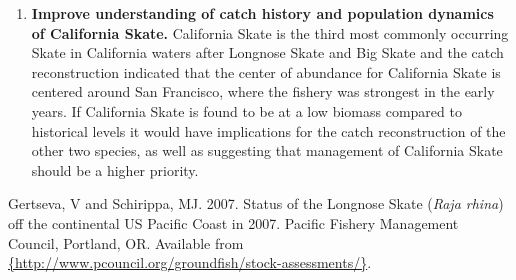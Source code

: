 \documentclass[12pt,]{article}
\begin{document}
\begin{enumerate}
\item \textbf{Improve understanding of catch history and population dynamics of California Skate.} California Skate is the third most commonly occurring Skate in California waters after Longnose Skate and Big Skate and the catch reconstruction indicated that the center of abundance for California Skate is centered around San Francisco, where the fishery was strongest in the early years. If California Skate is found to be at a low biomass compared to historical levels it would have implications for the catch reconstruction of the other two species, as well as suggesting that management of California Skate should be a higher priority.

\end{enumerate}

\FloatBarrier

\newpage
\renewcommand{\thefigure}{\arabic{figure}}
\renewcommand{\thetable}{\arabic{table}}
\setcounter{figure}{0}
\setcounter{table}{0}

\hypertarget{refs}{}
\leavevmode\hypertarget{ref-Gertseva2007}{}%
Gertseva, V and Schirippa, MJ. 2007. Status of the Longnose Skate
(\emph{Raja rhina}) off the continental US Pacific Coast in 2007.
Pacific Fishery Management Council, Portland, OR. Available from
\href{\%7Bhttp://www.pcouncil.org/groundfish/stock-assessments/\%7D}{\{http://www.pcouncil.org/groundfish/stock-assessments/\}}.
\end{document}
